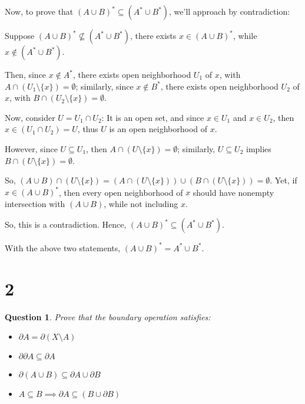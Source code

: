 \documentclass{article}
\newtheorem{question}{Question}
\begin{document}
\begin{itemize}
    \hfill

    Now, to prove that $(A\cup B)^* \subseteq (A^*\cup B^*)$, we'll approach by contradiction:

    Suppose $(A\cup B)^*\not\subseteq (A^*\cup B^*)$, there exists $x\in (A\cup B)^*$, while $x\notin (A^*\cup B^*)$.

    Then, since $x\notin A^*$, there exists open neighborhood $U_1$ of $x$, with $A\cap (U_1\setminus\{x\})=\emptyset$;
    similarly, since $x\notin B^*$, there exists open neighborhood $U_2$ of $x$, with $B\cap (U_2\setminus\{x\})=\emptyset$.

    Now, consider $U=U_1\cap U_2$: It is an open set, and since $x\in U_1$ and $x\in U_2$, then $x\in (U_1\cap U_2)=U$, thus $U$ is an open neighborhood of $x$.

    However, since $U\subseteq U_1$, then $A\cap (U\setminus\{x\})=\emptyset$; similarly, $U\subseteq U_2$ implies $B\cap (U\setminus\{x\})=\emptyset$.

    So, $(A\cup B)\cap (U\setminus\{x\})=(A\cap (U\setminus\{x\}))\cup (B\cap (U\setminus\{x\}))=\emptyset$. Yet, if $x\in (A\cup B)^*$, 
    then every open neighborhood of $x$ should have nonempty intersection with $(A\cup B)$, while not including $x$.

    So, this is a contradiction. Hence, $(A\cup B)^*\subseteq (A^*\cup B^*)$.

    \hfill

    With the above two statements, $(A\cup B)^*=A^*\cup B^*$.
\end{itemize}

\break

\section*{2}
\begin{myBox}[]{}
    \begin{question}
        Prove that the boundary operation satisfies:
        \begin{itemize}
            \item $\partial A=\partial(X\setminus A)$
            \item $\partial\partial A\subseteq \partial A$
            \item $\partial(A\cup B)\subseteq \partial A\cup \partial B$
            \item $A\subseteq B\implies \partial A\subseteq (B\cup \partial B)$
        \end{itemize}
    \end{question}
\end{myBox}
\end{document}
